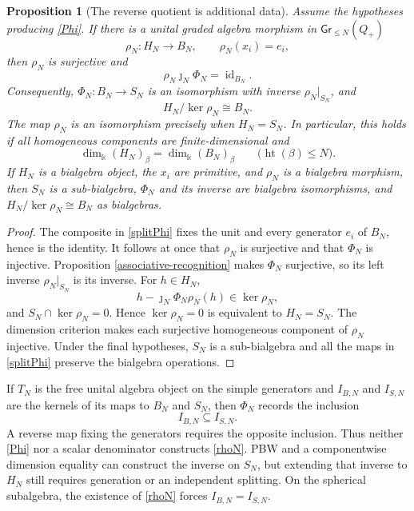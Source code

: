 \documentclass[11pt]{article}
\newtheorem{proposition}[theorem]{Proposition}
\newcommand{\kk}{\Bbbk}
\newcommand{\htop}{\operatorname{ht}}
\begin{document}
\begin{proposition}[The reverse quotient is additional data] \label{reverse-quotient}
Assume the hypotheses producing \eqref{Phi}.  If there is a unital graded
algebra morphism in $\mathsf{Gr}_{\leq N}(Q_+)$
\begin{equation}
 \rho_N:H_N\longrightarrow B_N,\qquad \rho_N(x_i)=e_i,       \label{rhoN}
\end{equation}
then $\rho_N$ is surjective and
\begin{equation}
 \rho_N\jmath_N\Phi_N=\operatorname{id}_{B_N}.              \label{splitPhi}
\end{equation}
Consequently, $\Phi_N:B_N\to S_N$ is an isomorphism with inverse
$\rho_N|_{S_N}$, and
\[
 H_N/\ker\rho_N\cong B_N.
\]
The map $\rho_N$ is an isomorphism precisely when $H_N=S_N$.  In
particular, this holds if all homogeneous components are finite-dimensional
and
\[
 \dim_\kk(H_N)_\beta=\dim_\kk(B_N)_\beta
 \qquad\bigl(\htop(\beta)\leq N\bigr).
\]
If $H_N$ is a bialgebra object, the $x_i$ are primitive, and $\rho_N$ is a
bialgebra morphism, then $S_N$ is a sub-bialgebra, $\Phi_N$ and its inverse
are bialgebra isomorphisms, and $H_N/\ker\rho_N\cong B_N$ as bialgebras.
\end{proposition}

\begin{proof}
The composite in \eqref{splitPhi} fixes the unit and every generator $e_i$
of $B_N$, hence is the identity.  It follows at once that $\rho_N$ is
surjective and that $\Phi_N$ is injective.  Proposition
\ref{associative-recognition} makes $\Phi_N$ surjective, so its left inverse
$\rho_N|_{S_N}$ is its inverse.  For $h\in H_N$,
\[
 h-\jmath_N\Phi_N\rho_N(h)\in\ker\rho_N,
\]
and $S_N\cap\ker\rho_N=0$.  Hence $\ker\rho_N=0$ is equivalent to
$H_N=S_N$.  The dimension criterion makes each surjective homogeneous
component of $\rho_N$ injective.  Under the final hypotheses,
$S_N$ is a sub-bialgebra and all the maps in \eqref{splitPhi} preserve the
bialgebra operations.
\end{proof}

If $T_N$ is the free unital algebra object on the simple generators and
$I_{B,N}$ and $I_{S,N}$ are the kernels of its maps to $B_N$ and $S_N$,
then $\Phi_N$ records the inclusion
\[
 I_{B,N}\subseteq I_{S,N}.
\]
A reverse map fixing the generators requires the opposite inclusion.
Thus neither \eqref{Phi} nor a scalar denominator constructs \eqref{rhoN}.
PBW and a componentwise dimension equality can construct the inverse on
$S_N$, but extending that inverse to $H_N$ still requires generation or an
independent splitting.  On the spherical subalgebra, the existence of
\eqref{rhoN} forces $I_{B,N}=I_{S,N}$.
\end{document}
